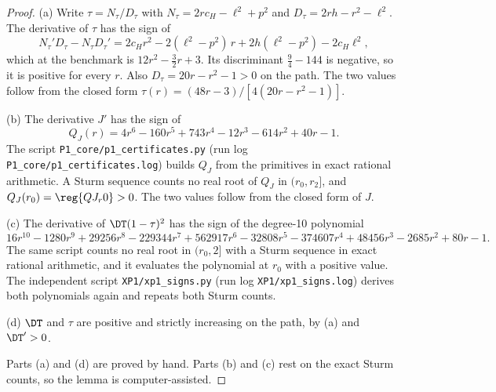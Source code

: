 \begin{proof}
(a) Write \(\tau=N_\tau/D_\tau\) with \(N_\tau=2rc_H-\ell^2+p^2\) and \(D_\tau=2rh-r^2-\ell^2\). The derivative
of \(\tau\) has the sign of
\[
N_\tau'D_\tau-N_\tau D_\tau'=2c_Hr^2-2(\ell^2-p^2)\,r+2h(\ell^2-p^2)-2c_H\ell^2 ,
\]
which at the benchmark is \(12r^2-\tfrac32r+3\). Its discriminant \(\tfrac94-144\) is negative, so it is positive
for every \(r\). Also \(D_\tau=20r-r^2-1>0\) on the path. The two values follow from the closed form
\(\tau(r)=(48r-3)/[4(20r-r^2-1)]\).

(b) The derivative \(J'\) has the sign of
\[
Q_J(r)=4r^6-160r^5+743r^4-12r^3-614r^2+40r-1 .
\]
The script \nolinkurl{P1_core/p1_certificates.py} (run log
\nolinkurl{P1_core/p1_certificates.log}) builds \(Q_J\) from the
primitives in exact rational arithmetic. A Sturm sequence counts no real root of \(Q_J\) in \((r_0,r_2]\), and
\(Q_J(r_0)=\reg{QJ_r0}>0\). The two values follow from the closed form of \(J\).

(c) The derivative of \(\DT(1-\tau)^2\) has the sign of the degree-10 polynomial
\[
16r^{10}-1280r^9+29256r^8-229344r^7+562917r^6-32808r^5-374607r^4+48456r^3-2685r^2+80r-1 .
\]
The same script counts no real root in \((r_0,2]\) with a Sturm sequence in exact rational arithmetic, and it
evaluates the polynomial at \(r_0\) with a positive value. The independent script
\nolinkurl{XP1/xp1_signs.py} (run log
\nolinkurl{XP1/xp1_signs.log}) derives both polynomials again and repeats
both Sturm counts.

(d) \(\DT\) and \(\tau\) are positive and strictly increasing on the path, by (a) and \(\DT'>0\).

Parts (a) and (d) are proved by hand. Parts (b) and (c) rest on the exact Sturm counts, so the lemma is
computer-assisted.
\end{proof}

